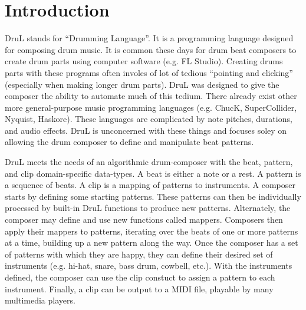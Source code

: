 
\chapter{Introduction}

DruL stands for ``Drumming Language''.  It is a programming language designed for composing drum music.  It is common these days for drum beat composers to create drum parts using computer software (e.g. FL Studio).  Creating drums parts with these programs often involes of lot of tedious ``pointing and clicking'' (especially when making longer drum parts).  DruL was designed to give the composer the ability to automate much of this tedium.  There already exist other more general-purpose music programming languages (e.g. ChucK, SuperCollider, Nyquist, Haskore).  These languages are complicated by note pitches, durations, and audio effects.  DruL is unconcerned with these things and focuses soley on allowing the drum composer to define and manipulate beat patterns.

DruL meets the needs of an algorithmic drum-composer with the beat, pattern, and clip domain-specific data-types.  A beat is either a note or a rest.  A pattern is a sequence of beats.  A clip is a mapping of patterns to instruments.  A composer starts by defining some starting patterns.  These patterns can then be individually processed by built-in DruL functions to produce new patterns.  Alternately, the composer may define and use new functions called mappers.  Composers then apply their mappers to patterns, iterating over the beats of one or more patterns at a time, building up a new pattern along the way.  Once the composer has a set of patterns with which they are happy, they can define their desired set of instruments (e.g. hi-hat, snare, bass drum, cowbell, etc.).  With the instruments defined, the composer can use the clip constuct to assign a pattern to each instrument.  Finally, a clip can be output to a MIDI file, playable by many multimedia players.
